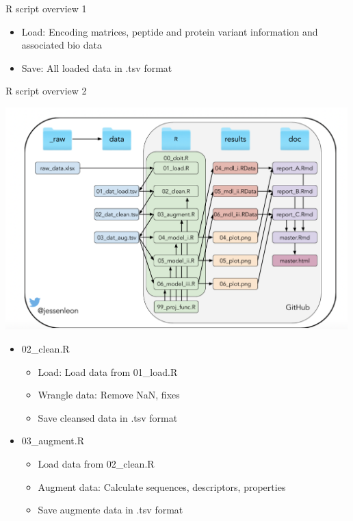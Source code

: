\documentclass[ignorenonframetext,]{beamer}
\providecommand{\tightlist}{%
  \setlength{\itemsep}{0pt}\setlength{\parskip}{0pt}}
\begin{document}
\begin{frame}
\begin{block}{R script overview 1}
\begin{itemize}
  \begin{itemize}
  \tightlist
  \item
    Load: Encoding matrices, peptide and protein variant information and
    associated bio data
  \item
    Save: All loaded data in .tsv format
  \end{itemize}
\end{itemize}

\end{block}

\begin{block}{R script overview 2}

\includegraphics[width=5.20833in,height=\textheight]{project_organisation.png}

\begin{itemize}
\tightlist
\item
  02\_clean.R

  \begin{itemize}
  \tightlist
  \item
    Load: Load data from 01\_load.R
  \item
    Wrangle data: Remove NaN, fixes
  \item
    Save cleansed data in .tsv format
  \end{itemize}
\item
  03\_augment.R

  \begin{itemize}
  \tightlist
  \item
    Load data from 02\_clean.R
  \item
    Augment data: Calculate sequences, descriptors, properties
  \item
    Save augmente data in .tsv format
  \end{itemize}
\end{itemize}


\end{block}
\end{frame}
\end{document}
